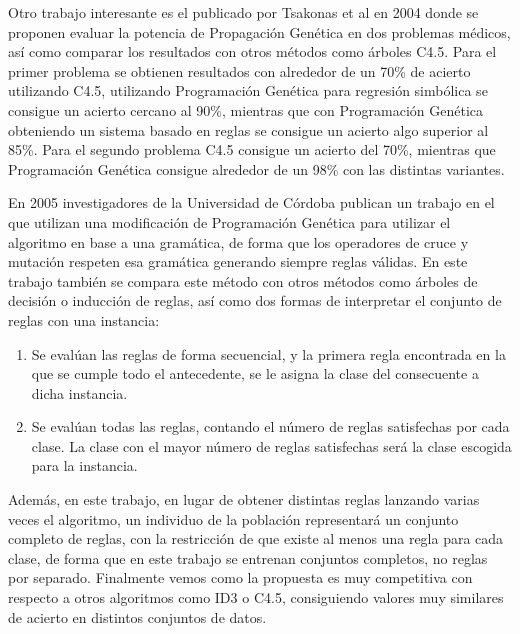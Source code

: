 Otro trabajo interesante es el publicado por Tsakonas et al en 2004 \cite{reglasDosDominiosMedicosComparacion} donde se proponen evaluar la potencia de Propagación Genética en dos problemas médicos, así como comparar los resultados con otros métodos como árboles C4.5. Para el primer problema se obtienen resultados con alrededor de un 70\% de acierto utilizando C4.5, utilizando Programación Genética para regresión simbólica se consigue un acierto cercano al 90\%, mientras que con Programación Genética obteniendo un sistema basado en reglas se consigue un acierto algo superior al 85\%. Para el segundo problema C4.5 consigue un acierto del 70\%, mientras que Programación Genética consigue alrededor de un 98\% con las distintas variantes.

En 2005 investigadores de la Universidad de Córdoba publican un trabajo \cite{grammarBasedPG} en el que utilizan una modificación de Programación Genética para utilizar el algoritmo en base a una gramática, de forma que los operadores de cruce y mutación respeten esa gramática generando siempre reglas válidas. En este trabajo también se compara este método con otros métodos como árboles de decisión o inducción de reglas, así como dos formas de interpretar el conjunto de reglas con una instancia:

\begin{enumerate}
	\item Se evalúan las reglas de forma secuencial, y la primera regla encontrada en la que se cumple todo el antecedente, se le asigna la clase del consecuente a dicha instancia.
	\item Se evalúan todas las reglas, contando el número de reglas satisfechas por cada clase. La clase con el mayor número de reglas satisfechas será la clase escogida para la instancia.
\end{enumerate}

Además, en este trabajo, en lugar de obtener distintas reglas lanzando varias veces el algoritmo, un individuo de la población representará un conjunto completo de reglas, con la restricción de que existe al menos una regla para cada clase, de forma que en este trabajo se entrenan conjuntos completos, no reglas por separado. Finalmente vemos como la propuesta es muy competitiva con respecto a otros algoritmos como ID3 o C4.5, consiguiendo valores muy similares de acierto en distintos conjuntos de datos.

